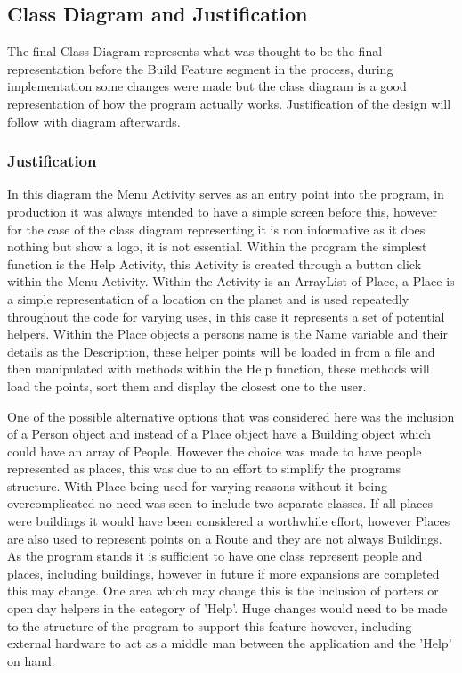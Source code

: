 \newpage
\subsection{Class Diagram and Justification}
The final Class Diagram represents what was thought to be the final representation before the Build Feature segment in the process, during implementation some changes were made but the class diagram is a good representation of how the program actually works. Justification of the design will follow with diagram afterwards. 
\subsubsection{Justification}
In this diagram the Menu Activity serves as an entry point into the program, in production it was always intended to have a simple screen before this, however for the case of the class diagram representing it is non informative as it does nothing but show a logo, it is not essential. Within the program the simplest function is the Help Activity, this Activity is created through a button click within the Menu Activity. Within the Activity is an ArrayList of Place, a Place is a simple representation of a location on the planet and is used repeatedly throughout the code for varying uses, in this case it represents a set of potential helpers. Within the Place objects a persons name is the Name variable and their details as the Description, these helper points will be loaded in from a file and then manipulated with methods within the Help function, these methods will load the points, sort them and display the closest one to the user. 

One of the possible alternative options that was considered here was the inclusion of a Person object and instead of a Place object have a Building object which could have an array of People. However the choice was made to have people represented as places, this was due to an effort to simplify the programs structure. With Place being used for varying reasons without it being overcomplicated no need was seen to include two separate classes. If all places were buildings it would have been considered a worthwhile effort, however Places are also used to represent points on a Route and they are not always Buildings. As the program stands it is sufficient to have one class represent people and places, including buildings, however in future if more expansions are completed this may change. One area which may change this is the inclusion of porters or open day helpers in the category of 'Help'. Huge changes would need to be made to the structure of the program to support this feature however, including external hardware to act as a middle man between the application and the 'Help' on hand. 

